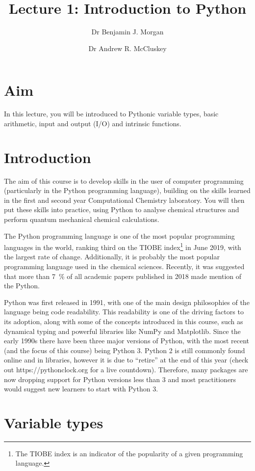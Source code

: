 \documentclass[a4paper]{article}
\title{Lecture 1: Introduction to Python}
\author[1]{Dr Benjamin J. Morgan}
\author[1,2]{Dr Andrew R. McCluskey}
\affil[1]{Department of Chemistry, University of Bath, email: b.j.morgan@bath.ac.uk}
\affil[2]{Diamond Light Source, email: andrew.mccluskey@diamond.ac.uk}
\begin{document}
\maketitle

\section*{Aim}
In this lecture, you will be introduced to Pythonic variable types, basic arithmetic, input and output (I/O) and intrinsic functions. 

\newpage
\section{Introduction}

The aim of this course is to develop skills in the user of computer programming (particularly in the Python programming language), building on the skills learned in the first and second year Computational Chemistry laboratory. 
You will then put these skills into practice, using Python to analyse chemical structures and perform quantum mechanical chemical calculations. 

The Python programming language is one of the most popular programming languages in the world, ranking third on the TIOBE index\footnote{The TIOBE index is an indicator of the popularity of a given programming language.} in June 2019\cite{tiobe_index}, with the largest rate of change. 
Additionally, it is probably the most popular programming language used in the chemical sciences. 
Recently, it was suggested that more than \SI{7}{\percent} of all academic papers published in 2018 made mention of the Python. 

Python was first released in 1991, with one of the main design philosophies of the language being code readability. 
This readability is one of the driving factors to its adoption, along with some of the concepts introduced in this course, such as dynamical typing and powerful libraries like NumPy and Matplotlib. 
Since the early 1990s there have been three major versions of Python, with the most recent (and the focus of this course) being Python 3. 
Python 2 is still commonly found online and in libraries, however it is due to ``retire'' at the end of this year (check out https://pythonclock.org for a live countdown). 
Therefore, many packages are now dropping support for Python versions less than 3 and most practitioners would suggest new learners to start with Python 3. 

\section{Variable types}



\end{document}
